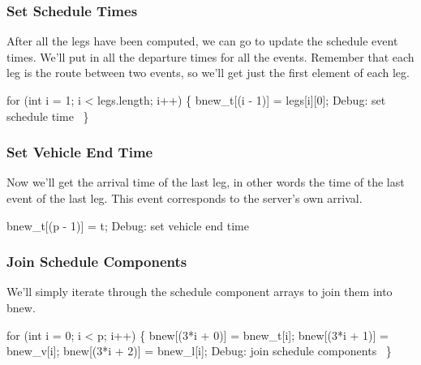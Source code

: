 \subsubsection{Set Schedule Times}

After all the legs have been computed, we can go to update the schedule event
times. We'll put in all the departure times for all the events. Remember that
each leg is the route between two events, so we'll get just the first element
of each leg.

\nwenddocs{}\endmoddef\nwstartdeflinemarkup{}\nwenddeflinemarkup
for (int i = 1; i < legs.length; i++) \{
  bnew_t[(i - 1)] = legs[i][0];
  \LA{}Debug: set schedule time~{\nwtagstyle{}}\RA{}
\}
\nwendcode{}\nwdocspar

\subsubsection{Set Vehicle End Time}

Now we'll get the arrival time of the last leg, in other words the time of
the last event of the last leg. This event corresponds to the server's
own arrival.

\nwenddocs{}\endmoddef\nwstartdeflinemarkup{}\nwenddeflinemarkup
bnew_t[(p - 1)] = t;
\LA{}Debug: set vehicle end time~{\nwtagstyle{}}\RA{}
\nwendcode{}\nwdocspar

\subsubsection{Join Schedule Components}

We'll simply iterate through the schedule component arrays to join them
into {\Tt{}bnew\nwendquote}.

\nwenddocs{}\endmoddef\nwstartdeflinemarkup{}\nwenddeflinemarkup
for (int i = 0; i < p; i++) \{
  bnew[(3*i + 0)] = bnew_t[i];
  bnew[(3*i + 1)] = bnew_v[i];
  bnew[(3*i + 2)] = bnew_l[i];
  \LA{}Debug: join schedule components~{\nwtagstyle{}}\RA{}
\}
\nwendcode{}\nwdocspar

